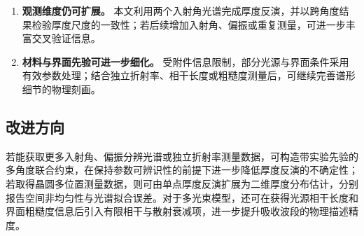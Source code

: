 \begin{enumerate}[label=\textbf{\arabic*.}]
\item \textbf{观测维度仍可扩展。} 本文利用两个入射角光谱完成厚度反演，并以跨角度结果检验厚度尺度的一致性；若后续增加入射角、偏振或重复测量，可进一步丰富交叉验证信息。

\item \textbf{材料与界面先验可进一步细化。} 受附件信息限制，部分光源与界面条件采用有效参数处理；结合独立折射率、相干长度或粗糙度测量后，可继续完善谱形细节的物理刻画。
\end{enumerate}

\subsection{改进方向}

若能获取更多入射角、偏振分辨光谱或独立折射率测量数据，可构造带实验先验的多角度联合约束，在保持参数可辨识性的前提下进一步降低厚度反演的不确定性；若取得晶圆多位置测量数据，则可由单点厚度反演扩展为二维厚度分布估计，分别报告空间非均匀性与光谱拟合误差。对于多光束模型，还可在获得光源相干长度和界面粗糙度信息后引入有限相干与散射衰减项，进一步提升吸收波段的物理描述精度。
